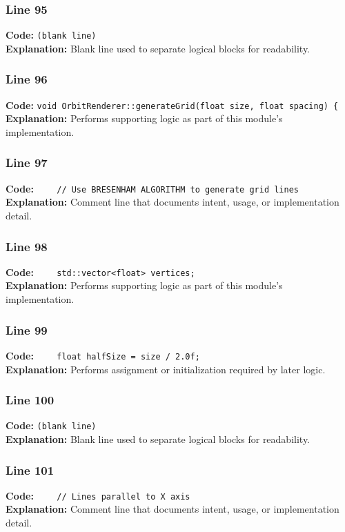 \documentclass[11pt,a4paper]{article}
\begin{document}
\subsubsection*{Line 95}
\textbf{Code:} \texttt{(blank line)}\\
\textbf{Explanation:} Blank line used to separate logical blocks for readability.

\subsubsection*{Line 96}
\textbf{Code:} \verb|void OrbitRenderer::generateGrid(float size, float spacing) {|\\
\textbf{Explanation:} Performs supporting logic as part of this module's implementation.

\subsubsection*{Line 97}
\textbf{Code:} \verb|    // Use BRESENHAM ALGORITHM to generate grid lines|\\
\textbf{Explanation:} Comment line that documents intent, usage, or implementation detail.

\subsubsection*{Line 98}
\textbf{Code:} \verb|    std::vector<float> vertices;|\\
\textbf{Explanation:} Performs supporting logic as part of this module's implementation.

\subsubsection*{Line 99}
\textbf{Code:} \verb|    float halfSize = size / 2.0f;|\\
\textbf{Explanation:} Performs assignment or initialization required by later logic.

\subsubsection*{Line 100}
\textbf{Code:} \texttt{(blank line)}\\
\textbf{Explanation:} Blank line used to separate logical blocks for readability.

\subsubsection*{Line 101}
\textbf{Code:} \verb|    // Lines parallel to X axis|\\
\textbf{Explanation:} Comment line that documents intent, usage, or implementation detail.
\end{document}
